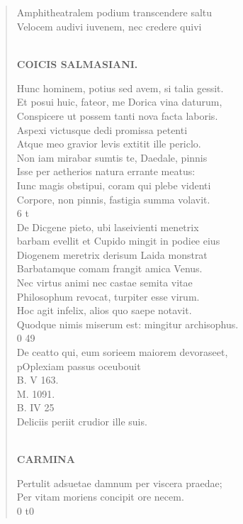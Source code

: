 \documentclass[11pt, a4paper]{report}
\begin{document}
            \subsection*{}
      \begin{verse}
      Amphitheatralem podium transcendere saltu \\ Velocem audivi iuvenem, nec credere quivi \\ 
        ﻿\pagebreak 
    \begin{center} \textbf{COICIS SALMASIANI.} \end{center} \marginpar{[287]} Hunc hominem, potius sed avem, si talia gessit. \\ Et posui huic, fateor, me Dorica vina daturum, \\ Conspicere ut possem tanti nova facta laboris. \\ Aspexi victusque dedi promissa petenti \\ Atque meo gravior levis extitit ille periclo. \\ Non iam mirabar sumtis te, Daedale, pinnis \\ Isse per aetherios natura errante meatus: \\ Iunc magis obstipui, coram qui plebe videnti \\ Corpore, non pinnis, fastigia summa volavit. \\ 6 t \\ De Dicgene pieto, ubi laseivienti menetrix \\ barbam evellit et Cupido mingit in podiee eius \\ Diogenem meretrix derisum Laida monstrat \\ Barbatamque comam frangit amica Venus. \\ Nec virtus animi nec castae semita vitae \\ Philosophum revocat, turpiter esse virum. \\ Hoc agit infelix, alios quo saepe notavit. \\ Quodque nimis miserum est: mingitur archisophus. \\ 0 49 \\ De ceatto qui, eum sorieem maiorem devoraseet, \\ pOplexiam passus oceubouit \\ B. V 163. \\ M. 1091. \\ B. IV 25 \\ Deliciis periit crudior ille suis. \\ 
        ﻿\pagebreak 
     \marginpar{[288]} \begin{center} \textbf{CARMINA} \end{center}Pertulit adsuetae damnum per viscera praedae; \\ Per vitam moriens concipit ore necem. \\ 0 t0 \\ 
      \end{verse}
  
\end{document}
